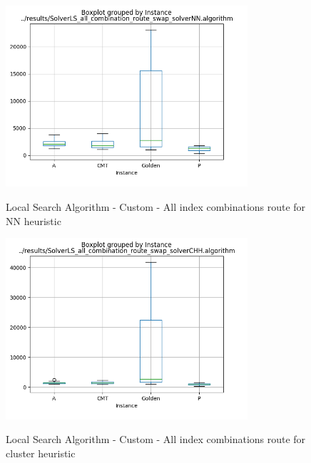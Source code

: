 \documentclass[12pt]{article}
\begin{document}
\begin{appendices}
\begin{figure}[!htb]
	\centering
	\caption{Local Search Algorithm - Custom - All index combinations route for NN heuristic}{\includegraphics[width=0.8\textwidth]{SolverLS_all_combination_route_swap_solverNN_algorithm_boxplot.png}\label{fig:all_combinations_localsearch_boxplot_fig_nn}}
\end{figure}
\begin{figure}[!htb]
	\centering
	\caption{Local Search Algorithm - Custom - All index combinations route for cluster heuristic}{\includegraphics[width=0.8\textwidth]{SolverLS_all_combination_route_swap_solverCHH_algorithm_boxplot.png}\label{fig:all_combinations_localsearch_boxplot_fig_cluster}}
\end{figure}


\end{appendices}
\end{document}
